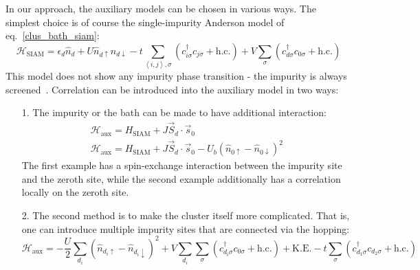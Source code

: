 \documentclass[10pt]{report}
\numberwithin{equation}{section}
\begin{document}
In our approach, the auxiliary models can be chosen in various ways. The simplest choice is of course the single-impurity Anderson model of eq.~\ref{clus_bath_siam}:
\begin{equation}
\mathcal{H}_\text{SIAM} = \epsilon_d \hat n_d + U \hat n_{d \uparrow} \hat n_{d \downarrow} - t\sum_{\left<i,j \right>, \sigma}\left(c^\dagger_{i\sigma}c_{j\sigma} + \text{h.c.}\right) + V\sum_\sigma \left( c^\dagger_{d\sigma}c_{0\sigma} + \text{h.c.}\right) 
\end{equation}
This model does not show any impurity phase transition - the impurity is always screened~\cite{hrk_wilson_1980,wilson1975,bullaNRGreview}. Correlation can be introduced into the auxiliary model in two ways:
\begin{itemize}
	\item[1.] The impurity or the bath can be made to have additional interaction: 
\begin{gather}
\mathcal{H}_\text{aux} = H_\text{SIAM} + J \vec{S}_d\cdot\vec{s}_0\\
\mathcal{H}_\text{aux} = H_\text{SIAM} + J \vec{S}_d\cdot\vec{s}_0 - U_b \left(\hat n_{0 \uparrow} - \hat n_{0 \downarrow}\right)^2
\end{gather}
The first example has a spin-exchange interaction between the impurity site and the zeroth site, while the second example additionally has a correlation locally on the zeroth site.
\item[2.] The second method is to make the cluster itself more complicated. That is, one can introduce multiple impurity sites that are connected via the hopping:
\begin{equation}
\mathcal{H}_\text{aux} = -\frac{U}{2}\sum_{d_i}\left(\hat n_{d_i \uparrow} - \hat n_{d_i \downarrow}\right) ^2 + V\sum_{d_i}\sum_\sigma\left( c^\dagger_{d_i\sigma}c_{0\sigma} + \text{h.c.} \right) + \text{K.E.} - t\sum_{\sigma}\left(c^\dagger_{d_1\sigma}c_{d_2\sigma} + \text{h.c.}\right)
\end{equation}
	
\end{itemize}
\end{document}
